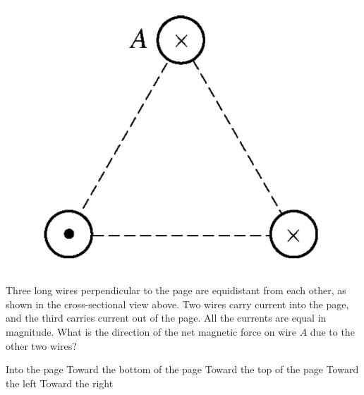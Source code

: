 \begin{figure}[H]
\centering
\includegraphics[scale=0.3]{images/13.png}
\end{figure}

\begin{questions}\setcounter{question}{12}\question
Three long wires perpendicular to the page are equidistant from each other, as shown in the cross-sectional view above. Two wires carry current into the page, and the third carries current out of the page. All the currents are equal in magnitude. What is the direction of the net magnetic force on wire $A$ due to the other two wires?

\begin{choices}
\choice Into the page
\choice Toward the bottom of the page
\choice Toward the top of the page
\choice Toward the left
\choice Toward the right
\end{choices}\end{questions}
